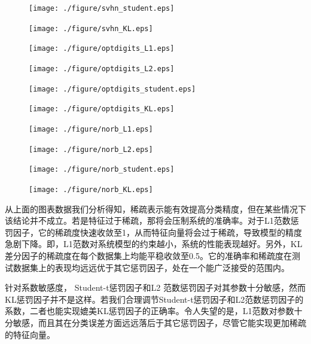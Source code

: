 \documentclass[oneside]{ZJUthesis}
\begin{document}
\begin{figure}[h]
\begin{minipage}[h]{0.24\linewidth}
\centering
\texttt{[image: ./figure/svhn\_student.eps]}
\end{minipage}
\hfill
\begin{minipage}[h]{0.24\linewidth}
\centering
\texttt{[image: ./figure/svhn\_KL.eps]}
\end{minipage}
\hfill
\begin{minipage}[h]{0.24\linewidth}
\centering
\texttt{[image: ./figure/optdigits\_L1.eps]}
\end{minipage}
\hfill
\begin{minipage}[h]{0.24\linewidth}
\centering
\texttt{[image: ./figure/optdigits\_L2.eps]}
\end{minipage}
\hfill
\begin{minipage}[h]{0.24\linewidth}
\centering
\texttt{[image: ./figure/optdigits\_student.eps]}
\end{minipage}
\hfill
\begin{minipage}[h]{0.24\linewidth}
\centering
\texttt{[image: ./figure/optdigits\_KL.eps]}
\end{minipage}
\hfill
\begin{minipage}[h]{0.24\linewidth}
\centering
\texttt{[image: ./figure/norb\_L1.eps]}
\end{minipage}
\hfill
\begin{minipage}[h]{0.24\linewidth}
\centering
\texttt{[image: ./figure/norb\_L2.eps]}
\end{minipage}
\hfill
\begin{minipage}[h]{0.24\linewidth}
\centering
\texttt{[image: ./figure/norb\_student.eps]}
\end{minipage}	
\hfill
\begin{minipage}[h]{0.24\linewidth}
\centering
\texttt{[image: ./figure/norb\_KL.eps]}
\end{minipage}		
\end{figure}

从上面的图表数据我们分析得知，稀疏表示能有效提高分类精度，但在某些情况下该结论并不成立。若是特征过于稀疏，那将会压制系统的准确率。对于L1范数惩罚因子，它的稀疏度快速收敛至1，从而特征向量将会过于稀疏，导致模型的精度急剧下降。即，L1范数对系统模型的约束越小，系统的性能表现越好。另外，KL差分因子的稀疏度在每个数据集上均能平稳收敛至0.5。它的准确率和稀疏度在测试数据集上的表现均远远优于其它惩罚因子，处在一个能广泛接受的范围内。


针对系数敏感度， Student-t惩罚因子和L2 范数惩罚因子对其参数十分敏感，然而KL惩罚因子并不是这样。若我们合理调节Student-t惩罚因子和L2范数惩罚因子的系数，二者也能实现媲美KL惩罚因子的正确率。令人失望的是，L1范数对参数十分敏感，而且其在分类误差方面远远落后于其它惩罚因子，尽管它能实现更加稀疏的特征向量。
\end{document}
